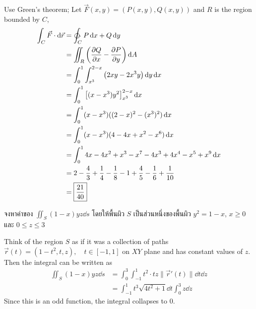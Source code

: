 \documentclass[12pt,final]{novelette} %
\begin{document}
\begin{question}
    \bigskip
    Use Green's theorem; Let $\vec{F}(x, y) = (P(x, y), Q(x, y))$ and $R$ is the region bounded by $C$,
    \begin{align*}
        \int_C \vec{F} \cdot \dd{\vec{r}} & = \ointctrclockwise_C P \dd{x} + Q \dd{y}                              \\
                                          & = \iint_R \left(\pdv{Q}{x} - \pdv{P}{y}\right) \dd{A}                  \\
                                          & = \int_0^1 \int_{x^3}^{2-x} \left(2xy - 2x^3y\right) \dd{y} \dd{x}     \\
                                          & = \int_0^1 \left[(x - x^3)y^2\right]_{x^3}^{2-x} \dd{x}                \\
                                          & = \int_0^1 (x - x^3)((2-x)^2 - (x^3)^2) \dd{x}                         \\
                                          & = \int_0^1 (x - x^3)(4 - 4x + x^2 - x^6) \dd{x}                        \\
                                          & = \int_0^1 4x - 4x^2 + x^3 - x^7 - 4x^3 + 4x^4 - x^5 + x^9 \dd{x}      \\
                                          & = 2 - \frac43 + \frac14 - \frac18 - 1 + \frac45 - \frac16 + \frac1{10} \\
                                          & = \boxed{\frac{21}{40}}
    \end{align*}

    \item {}
    จงหาค่าของ $\iint_S (1-x)yz \dd{s}$ โดยให้พื้นผิว $S$ เป็นส่วนหนึ่งของพื้นผิว $y^2 = 1-x$, $x \geq 0$ และ $0 \leq z \leq 3$ 

    \bigskip
    Think of the region $S$ as if it was a collection of paths $\vec{r}(t) = (1-t^2, t, z), \quad t \in [-1, 1]$ on $XY$ plane and has constant values of $z$.
    Then the integral can be written as
    \begin{align*}
        \iint_S(1-x)yz \dd{s} & = \int_0^3 \int_{-1}^1 t^2 \cdot t z \lVert \vec{r}'(t) \rVert \dd{t} \dd{z} \\
                              & = \int_{-1}^1 t^3 \sqrt{4t^2+1} \dd{t} \int_0^3 z \dd{z}
    \end{align*}
    Since this is an odd function, the integral collapses to $\boxed{0}$.


\end{question}
\end{document}
